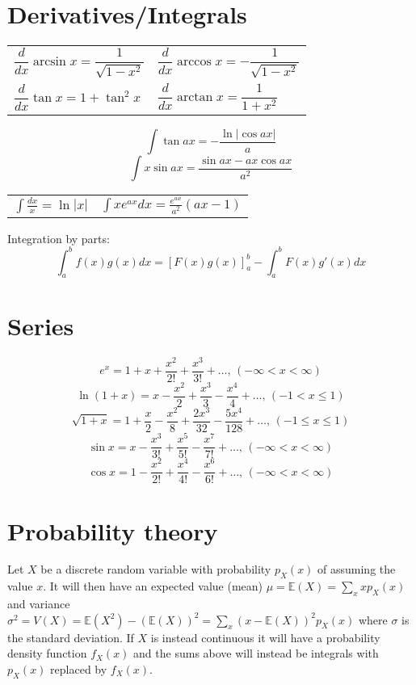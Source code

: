 \section{Derivatives/Integrals}
\begin{center}
\begin{tabular}{ll}
	$\dfrac{d}{dx}\arcsin x = \dfrac{1}{\sqrt{1-x^2}}$ & $\dfrac{d}{dx}\arccos x = -\dfrac{1}{\sqrt{1-x^2}}$ \\[2em]
	$\dfrac{d}{dx}\tan x = 1+\tan^2 x $ & $\dfrac{d}{dx}\arctan x = \dfrac{1}{1+x^2}$ \\
\end{tabular}
\end{center}
$$\int\tan ax = -\dfrac{\ln|\cos ax|}{a}$$
$$\int x\sin ax = \dfrac{\sin ax-ax \cos ax}{a^2}$$
\begin{center}
\begin{tabular}{ll}
	$\int \frac{dx}{x} = \ln|x|$ & $\int xe^{ax}dx = \frac{e^{ax}}{a^2}(ax-1)$ \\
\end{tabular}
\end{center}

Integration by parts:
\[\int_a^bf(x)g(x)dx = [F(x)g(x)]_a^b-\int_a^bF(x)g'(x)dx\]

\section{Series} 
$$e^x = 1+x+\frac{x^2}{2!}+\frac{x^3}{3!}+\dots,\,(-\infty<x<\infty)$$
$$\ln(1+x) = x-\frac{x^2}{2}+\frac{x^3}{3}-\frac{x^4}{4}+\dots,\,(-1<x\leq1)$$
$$\sqrt{1+x} = 1+\frac{x}{2}-\frac{x^2}{8}+\frac{2x^3}{32}-\frac{5x^4}{128}+\dots,\,(-1\leq x\leq1)$$
$$\sin x = x-\frac{x^3}{3!}+\frac{x^5}{5!}-\frac{x^7}{7!}+\dots,\,(-\infty<x<\infty)$$
$$\cos x = 1-\frac{x^2}{2!}+\frac{x^4}{4!}-\frac{x^6}{6!}+\dots,\,(-\infty<x<\infty)$$

\section{Probability theory}
Let $X$ be a discrete random variable with probability $p_X(x)$ of assuming the value $x$. It will then have an expected value (mean) $\mu=\mathbb{E}(X)=\sum_xxp_X(x)$ and variance $\sigma^2=V(X)=\mathbb{E}(X^2)-(\mathbb{E}(X))^2=\sum_x(x-\mathbb{E}(X))^2p_X(x)$ where $\sigma$ is the standard deviation. If $X$ is instead continuous it will have a probability density function $f_X(x)$ and the sums above will instead be integrals with $p_X(x)$ replaced by $f_X(x)$.

